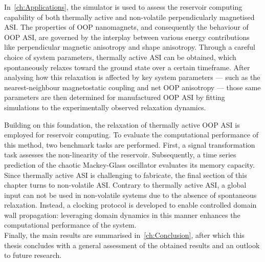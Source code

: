 In~\cref{ch:Applications}, the \hotspice simulator is used to assess the reservoir computing capability of both thermally active and non-volatile perpendicularly magnetised ASI.
The properties of OOP nanomagnets, and consequently the behaviour of OOP ASI, are governed by the interplay between various energy contributions like perpendicular magnetic anisotropy and shape anisotropy.
Through a careful choice of system parameters, thermally active ASI can be obtained, which spontaneously relaxes toward the ground state over a certain timeframe.
After analysing how this relaxation is affected by key system parameters --- such as the nearest-neighbour magnetostatic coupling and net OOP anisotropy --- those same parameters are then determined for manufactured OOP ASI by fitting simulations to the experimentally observed relaxation dynamics. \par
Building on this foundation, the relaxation of thermally active OOP ASI is employed for reservoir computing.
To evaluate the computational performance of this method, two benchmark tasks are performed.
First, a signal transformation task assesses the non-linearity of the reservoir.
Subsequently, a time series prediction of the chaotic Mackey-Glass oscillator evaluates its memory capacity.
Since thermally active ASI is challenging to fabricate, the final section of this chapter turns to non-volatile ASI.
Contrary to thermally active ASI, a global input can not be used in non-volatile systems due to the absence of spontaneous relaxation.
Instead, a clocking protocol is developed to enable controlled domain wall propagation: leveraging domain dynamics in this manner enhances the computational performance of the system. \\

Finally, the main results are summarised in~\cref{ch:Conclusion}, after which this thesis concludes with a general assessment of the obtained results and an outlook to future research.
